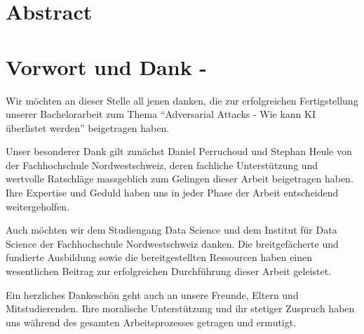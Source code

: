 \section*{Abstract} 



\clearpage
\section*{Vorwort und Dank -}

Wir möchten an dieser Stelle all jenen danken, die zur erfolgreichen Fertigstellung unserer Bachelorarbeit zum Thema ``Adversarial Attacks - Wie kann KI überlistet werden'' beigetragen haben.

Unser besonderer Dank gilt zunächst Daniel Perruchoud und Stephan Heule von der Fachhochschule Nordwestschweiz, deren fachliche Unterstützung und wertvolle Ratschläge massgeblich zum Gelingen dieser Arbeit beigetragen haben. Ihre Expertise und Geduld haben uns in jeder Phase der Arbeit entscheidend weitergeholfen.

Auch möchten wir dem Studiengang Data Science und dem Institut für Data Science der Fachhochschule Nordwestschweiz danken. Die breitgefächerte und fundierte Ausbildung sowie die bereitgestellten Ressourcen haben einen wesentlichen Beitrag zur erfolgreichen Durchführung dieser Arbeit geleistet.

Ein herzliches Dankeschön geht auch an unsere Freunde, Eltern und Mitstudierenden. Ihre moralische Unterstützung und ihr stetiger Zuspruch haben uns während des gesamten Arbeitsprozesses getragen und ermutigt.
